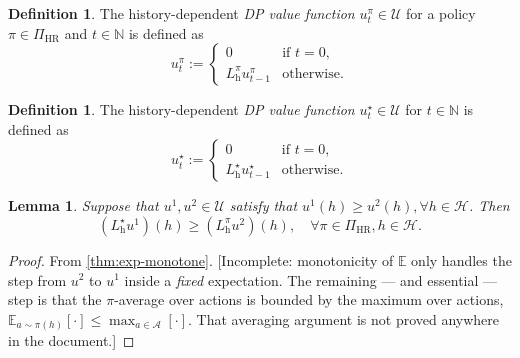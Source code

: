 \documentclass[letterpaper]{article}
\theoremstyle{plain}
\newtheorem{lemma}[theorem]{Lemma}
\theoremstyle{definition}
\newtheorem{definition}[theorem]{Definition}
\theoremstyle{remark}
\newcommand{\Nats}{\mathbb{N}}
\newcommand{\E}{\mathbb{E}}
\newcommand{\opt}{^{\star}}
\newcommand{\PiHR}{\Pi_{\mathrm{HR}}}
\newcommand{\cc}[1]{\textcolor{ccolor}{[#1]}}
\newcommand{\lean}[1]{\textcolor{blue}{(\emph{LEAN}: \texttt{#1})}}
\newcommand{\leanok}{}
\begin{document}
\begin{definition} \label{def:u-dp-pi}
  The history-dependent \emph{DP value function} $u_t^{\pi} \in \mathcal{U}$ for a policy $\pi\in \PiHR$ and $t\in \Nats$ is defined as
  \[
   u_t^{\pi} :=
   \begin{cases}
     0 &\text{if } t = 0, \\
     L_{\mathrm{h}}^{\pi} u_{t-1}^{\pi} &\text{otherwise}.
   \end{cases}
 \]
\end{definition}

\begin{definition} \label{def:u-dp-opt}
  The history-dependent \emph{DP value function} $u_t\opt \in \mathcal{U}$ for $t\in \Nats$ is defined as
  \[
   u_t\opt  :=
   \begin{cases}
     0 &\text{if } t = 0, \\
     L_{\mathrm{h}}\opt u_{t-1}\opt &\text{otherwise}.
   \end{cases}
 \]
\end{definition}

\begin{lemma}\label{thm:dp-opt-ge-dp-pi}
  Suppose that $u^1, u^2 \in \mathcal{U}$ satisfy that $u^1(h) \ge u^2(h), \forall h\in \mathcal{H}$. Then
  \[
   (L_{\mathrm{h}}\opt u^1)(h) \ge  
   (L_{\mathrm{h}}^{\pi} u^2)(h), \quad \forall \pi\in \PiHR, h\in \mathcal{H}.
  \]
\end{lemma}
\begin{proof}
  From \cref{thm:exp-monotone}.
  \cc{Incomplete: monotonicity of $\E$ only handles the step from $u^2$ to $u^1$ inside a \emph{fixed} expectation. The remaining --- and essential --- step is that the $\pi$-average over actions is bounded by the maximum over actions, $\E_{a\sim \pi(h)}[\cdot] \le \max_{a\in\mathcal{A}}[\cdot]$. That averaging argument is not proved anywhere in the document.}
\end{proof}
\end{document}
